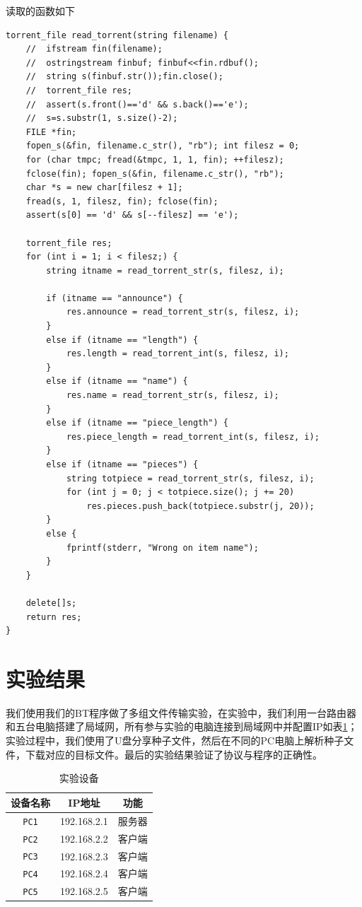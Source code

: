 \documentclass[thesis]{thesis}
\begin{document}
	读取的函数如下
\begin{lstlisting}
torrent_file read_torrent(string filename) {
	//	ifstream fin(filename);
	//	ostringstream finbuf; finbuf<<fin.rdbuf();
	//	string s(finbuf.str());fin.close();
	//	torrent_file res;
	//	assert(s.front()=='d' && s.back()=='e');
	//	s=s.substr(1, s.size()-2);
	FILE *fin;
	fopen_s(&fin, filename.c_str(), "rb"); int filesz = 0;
	for (char tmpc; fread(&tmpc, 1, 1, fin); ++filesz);
	fclose(fin); fopen_s(&fin, filename.c_str(), "rb");
	char *s = new char[filesz + 1];
	fread(s, 1, filesz, fin); fclose(fin);
	assert(s[0] == 'd' && s[--filesz] == 'e');

	torrent_file res;
	for (int i = 1; i < filesz;) {
		string itname = read_torrent_str(s, filesz, i);

		if (itname == "announce") {
			res.announce = read_torrent_str(s, filesz, i);
		}
		else if (itname == "length") {
			res.length = read_torrent_int(s, filesz, i);
		}
		else if (itname == "name") {
			res.name = read_torrent_str(s, filesz, i);
		}
		else if (itname == "piece_length") {
			res.piece_length = read_torrent_int(s, filesz, i);
		}
		else if (itname == "pieces") {
			string totpiece = read_torrent_str(s, filesz, i);
			for (int j = 0; j < totpiece.size(); j += 20)
				res.pieces.push_back(totpiece.substr(j, 20));
		}
		else {
			fprintf(stderr, "Wrong on item name");
		}
	}

	delete[]s;
	return res;
}
\end{lstlisting}

	
	\section{实验结果}
		我们使用我们的BT程序做了多组文件传输实验，在实验中，我们利用一台路由器和五台电脑搭建了局域网，所有参与实验的电脑连接到局域网中并配置IP如表\ref{tab:equipment}；实验过程中，我们使用了U盘分享种子文件，然后在不同的PC电脑上解析种子文件，下载对应的目标文件。最后的实验结果验证了协议与程序的正确性。
	\begin{table}[H]
		\caption{实验设备}
		\label{tab:equipment}
		\centering
		\begin{tabular}{|c|c|c|}\hline
			\textbf{设备名称} & \textbf{IP地址} &功能\\\hline
			\verb'PC1' & 192.168.2.1& 服务器\\\hline
			\verb'PC2' & 192.168.2.2& 客户端\\\hline
			\verb'PC3' & 192.168.2.3& 客户端\\\hline
			\verb'PC4' & 192.168.2.4& 客户端\\\hline
			\verb'PC5' & 192.168.2.5& 客户端\\\hline
		\end{tabular}
	\end{table}
\end{document}
